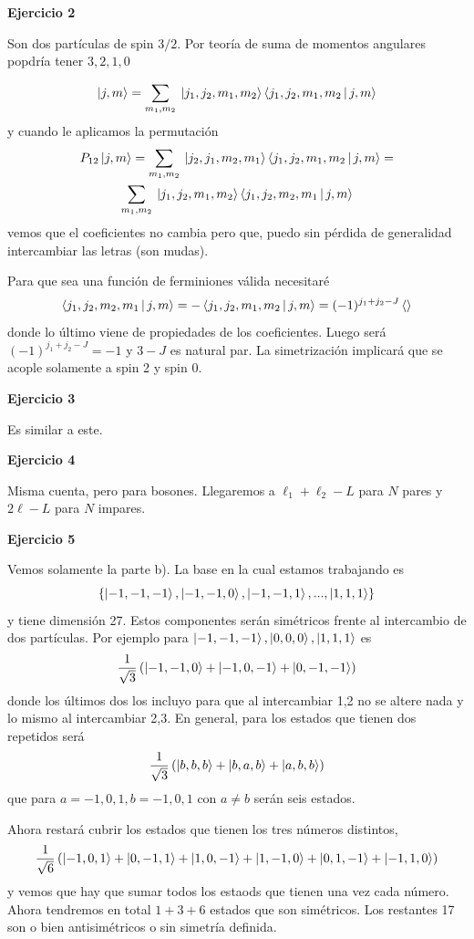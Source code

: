 \documentclass[10pt,oneside]{CBFT_book}
\begin{document}
\begin{ejemplo}{\bf Ejercicio 2}

Son dos partículas de spin $3/2$. Por teoría de suma de momentos angulares popdría tener
$3,2,1,0$

\[
	\Ket{j, m} = \sum_{m_1,m_2} \: \Ket{j_1,j_2,m_1,m_2} \Braket{j_1,j_2,m_1,m_2|j,m}
\]
y cuando le aplicamos la permutación
\begin{multline*}
	P_{12} \Ket{j, m} = \sum_{m_1,m_2} \: \Ket{j_2,j_1,m_2,m_1} \Braket{j_1,j_2,m_1,m_2|j,m} = \\
	\sum_{m_1,m_2} \: \Ket{j_1,j_2,m_1,m_2} \Braket{j_1,j_2,m_2,m_1|j,m}
\end{multline*}
vemos que el coeficientes no cambia pero que, puedo sin pérdida de generalidad intercambiar las
letras (son mudas).

Para que sea una función de ferminiones válida necesitaré
\[
	\Braket{j_1,j_2,m_2,m_1|j,m} = - \Braket{j_1,j_2,m_1,m_2|j,m} = (-1)^{j_1+j_2-J} \Braket{}
\]
donde lo último viene de propiedades de los coeficientes.
Luego será $(-1)^{j_1+j_2-J} = -1$ y $3-J$ es natural par.
La simetrización implicará que se acople solamente a spin 2 y spin 0.

\end{ejemplo}

\begin{ejemplo}{\bf Ejercicio 3}
 
Es similar a este. 
 
\end{ejemplo}

\begin{ejemplo}{\bf Ejercicio 4}
 
Misma cuenta, pero para bosones. Llegaremos a $\ell_1 + \ell_2 - L $  para $N$ pares y $2\ell - L$
para $N$ impares.
 
\end{ejemplo}

\begin{ejemplo}{\bf Ejercicio 5}

Vemos solamente la parte b). La base en la cual estamos trabajando es
\[
	\{  \Ket{-1,-1,-1}, \Ket{-1,-1,0}, \Ket{-1,-1,1}, ..., \Ket{1,1,1} \}
\]
y tiene dimensión 27. Estos componentes serán simétricos frente al intercambio de dos partículas.
Por ejemplo para $\Ket{-1,-1,-1}, \Ket{0,0,0}, \Ket{1,1,1}$ es
\[
	\frac{1}{\sqrt{3}} \left( \Ket{-1,-1,0} + \Ket{-1,0,-1} + \Ket{0,-1,-1}  \right)
\]
donde los últimos dos los incluyo para que al intercambiar 1,2 no se altere nada y lo mismo al
intercambiar 2,3.
En general, para los estados que tienen dos repetidos será
\[
	\frac{1}{\sqrt{3}} \left( \Ket{b,b,b} + \Ket{b,a,b} + \Ket{a,b,b}  \right)
\]
que para $a=-1,0,1, b=-1,0,1$ con $a\neq b$ serán seis estados.

Ahora restará cubrir los estados que tienen los tres números distintos, 
\[
	\frac{1}{\sqrt{6}} \left( 
	\Ket{-1,0,1} + \Ket{0,-1,1} + \Ket{1,0,-1} +
	\Ket{1,-1,0} + \Ket{0,1,-1} + \Ket{-1,1,0}
	\right)
\]
y vemos que hay que sumar todos los estaods que tienen una vez cada número.
Ahora tendremos en total $1+3+6$ estados que son simétricos. Los restantes 17 son o bien
antisimétricos o sin simetría definida.

\end{ejemplo}
\end{document}
